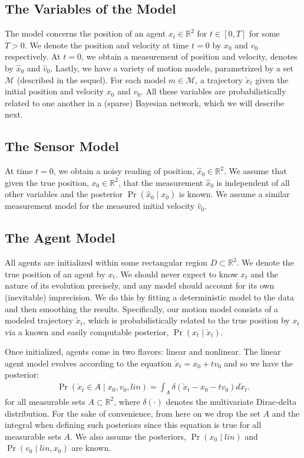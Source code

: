 \documentclass[letterpaper,10pt,conference]{ieeeconf}
\begin{document}
\subsection{The Variables of the Model}
The model concerns the position of an agent $x_t \in \mathbb{R}^2$ for $t \in [0,T]$ for some $T>0$.
We denote the position and velocity at time $t=0$ by $x_0$ and $v_0$ respectively.
At $t=0$, we obtain a measurement of position and velocity, denotes by $\hat{x}_0$ and $\hat{v}_0$.
Lastly, we have a variety of motion models, parametrized by a set $\mathcal{M}$ (described in the sequel).
For each model $m \in \mathcal{M}$, a trajectory $\check{x}_t$ given the initial position and velocity $x_0$ and $v_0$.
All these variables are probabilistically related to one another in a (sparse) Bayesian network, which we will describe next.

\subsection{The Sensor Model}
At time $t=0$, we obtain a noisy reading of position, $\hat{x}_0 \in \mathbb{R}^2$.
We assume that given the true position, $x_0 \in \mathbb{R}^2$, that the measurement $\hat{x}_0$ is independent of all other variables and the posterior $\Pr( \hat{x}_0 \mid x_0)$ is known.
We assume a similar measurement model for the measured initial velocity $\hat{v}_0$.

\subsection{The Agent Model}
All agents are initialized within some rectangular region $D \subset \mathbb{R}^2$.
We denote the true position of an agent by $x_t$.
We should never expect to know $x_t$ and the nature of its evolution precisely, and any model should account for its own (inevitable) imprecision.
We do this by fitting a deterministic model to the data and then smoothing the results.
Specifically, our motion model consists of a modeled trajectory $\check{x}_t$, which is probabilistically related to the true position by $x_t$ via a known and easily computable posterior, $\Pr(x_t \mid \check{x}_t)$.

Once initialized, agents come in two flavors: linear and nonlinear.
The linear agent model evolves according to the equation $\check{x}_t = x_0 + t v_0$ and so we have the posterior:
\begin{align}
	\Pr( \check{x}_t  \in A \mid x_0, v_0, lin) = \int_A \delta( \check{x}_t - x_0 - t v_0 ) d\check{x}_t.
\end{align}
for all measurable sets $A \subset \mathbb{R}^2$, where $\delta( \cdot )$ denotes the multivariate Dirac-delta distribution.
For the sake of convenience, from here on we drop the set $A$ and the integral when defining such posteriors since this equation is true for all measurable sets $A$.
We also assume the posteriors, $\Pr(x_0 \mid lin)$ and $\Pr( v_0 \mid lin, x_0)$ are known.
\end{document}
